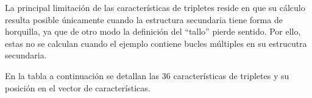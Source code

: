 
La principal limitación de las características de tripletes reside en
que su cálculo resulta posible únicamente cuando la estructura
secundaria tiene forma de horquilla, ya que de otro modo la definición
del ``tallo'' pierde sentido. Por ello, estas  no se
calculan cuando el ejemplo contiene bucles múltiples en su estrucutra
secundaria.


En la tabla a continuación se detallan las 36 características de
tripletes y su posición en el vector de características.


